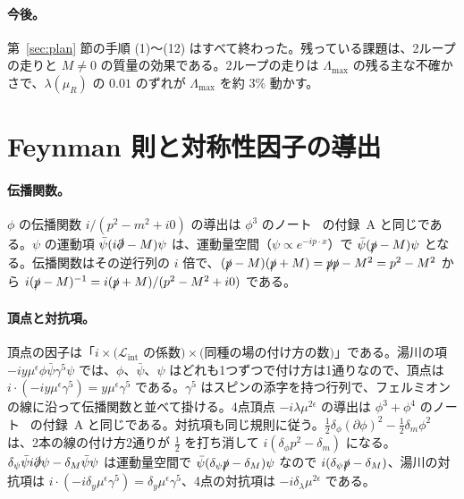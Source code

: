 \documentclass[a4paper,10pt]{ltjsarticle}
\begin{document}
\paragraph{今後。}第~\ref{sec:plan} 節の手順 (1)〜(12) はすべて終わった。残っている課題は、2ループの走りと $M\ne0$ の質量の効果である。2ループの走りは $\Lambda_{\max}$ の残る主な不確かさで、$\lambda(\mu_R)$ の $0.01$ のずれが $\Lambda_{\max}$ を約 $3\%$ 動かす。

\appendix

\section{Feynman 則と対称性因子の導出}\label{app:rules}

\paragraph{伝播関数。}$\phi$ の伝播関数 $i/(p^2-m^2+i0)$ の導出は $\phi^3$ のノート~\cite{phi3note} の付録~A と同じである。$\psi$ の運動項 $\bar\psi(i\slashed\partial-M)\psi$ は、運動量空間（$\psi\propto e^{-ip\cdot x}$）で $\bar\psi(\slashed p-M)\psi$ となる。伝播関数はその逆行列の $i$ 倍で、$(\slashed p-M)(\slashed p+M)=\slashed p\slashed p-M^2=p^2-M^2$ から $i(\slashed p-M)^{-1}=i(\slashed p+M)/(p^2-M^2+i0)$ である。

\paragraph{頂点と対抗項。}頂点の因子は「$i\times(\mathcal{L}_{\mathrm{int}}$ の係数$)\times($同種の場の付け方の数$)$」である。湯川の項 $-iy\mu^\epsilon\phi\bar\psi\gamma^5\psi$ では、$\phi$、$\bar\psi$、$\psi$ はどれも1つずつで付け方は1通りなので、頂点は $i\cdot(-iy\mu^\epsilon\gamma^5)=y\mu^\epsilon\gamma^5$ である。$\gamma^5$ はスピンの添字を持つ行列で、フェルミオンの線に沿って伝播関数と並べて掛ける。4点頂点 $-i\lambda\mu^{2\epsilon}$ の導出は $\phi^3+\phi^4$ のノート~\cite{phi34note} の付録~A と同じである。対抗項も同じ規則に従う。$\frac12\delta_\phi(\partial\phi)^2-\frac12\delta_m\phi^2$ は、2本の線の付け方2通りが $\frac12$ を打ち消して $i(\delta_\phi p^2-\delta_m)$ になる。$\delta_\psi\bar\psi i\slashed\partial\psi-\delta_M\bar\psi\psi$ は運動量空間で $\bar\psi(\delta_\psi\slashed p-\delta_M)\psi$ なので $i(\delta_\psi\slashed p-\delta_M)$、湯川の対抗項は $i\cdot(-i\delta_y\mu^\epsilon\gamma^5)=\delta_y\mu^\epsilon\gamma^5$、4点の対抗項は $-i\delta_\lambda\mu^{2\epsilon}$ である。
\end{document}
